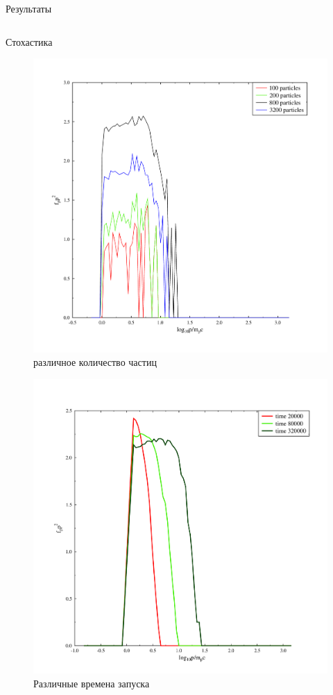 \documentclass[8pt,pdf,hyperref={unicode},serif]{beamer}
\begin{document}
\begin{frame}{Результаты}
\begin{columns}
\begin{column}{0.5\textwidth}
Стохастика
\begin{figure}[H]
\centering
\includegraphics[width=0.40\linewidth]{stoh_particles}
\caption{различное количество частиц}
\end{figure}
\begin{figure}[H]
\centering
\includegraphics[width=0.40\linewidth]{stoh_times}
\caption{Различные времена запуска}
\end{figure}
\end{column}
\end{columns}
\end{frame}
\end{document}
